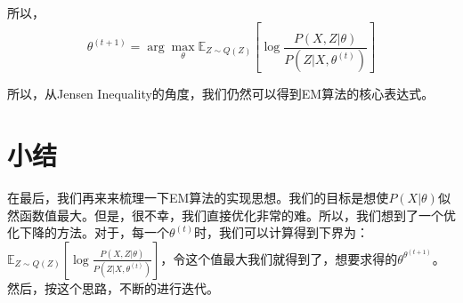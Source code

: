 \documentclass[a4paper]{article}
\begin{document}
所以，
\begin{equation}
    \theta^{(t+1)} = \arg\max_{\theta} \mathbb{E}_{Z\sim Q(Z)}\left[ \log \frac{P(X,Z|\theta)}{P(Z|X,\theta^{(t)})} \right]
\end{equation}

所以，从Jensen Inequality的角度，我们仍然可以得到EM算法的核心表达式。

\section{小结}
在最后，我们再来来梳理一下EM算法的实现思想。我们的目标是想使$P(X|\theta)$似然函数值最大。但是，很不幸，我们直接优化非常的难。所以，我们想到了一个优化下降的方法。对于，每一个$\theta^{(t)}$时，我们可以计算得到下界为：$\mathbb{E}_{Z\sim Q(Z)}\left[ \log \frac{P(X,Z|\theta)}{P(Z|X,\theta^{(t)})} \right]$，令这个值最大我们就得到了，想要求得的$\theta^{\theta^{(t+1)}}$。然后，按这个思路，不断的进行迭代。
\end{document}
